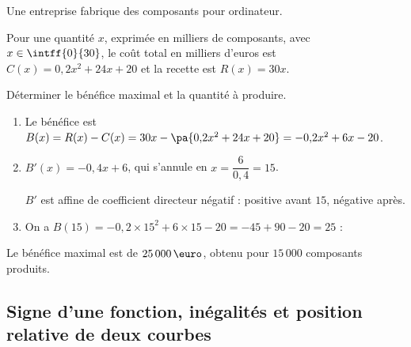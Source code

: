 \begin{methode}
	Une entreprise fabrique des composants pour ordinateur.

	Pour une quantité $x$, exprimée en milliers de composants, avec $x \in \intff{0}{30}$, le coût total en milliers d'euros est $C(x) = 0{,}2x^2 + 24x + 20$ et la recette est $R(x) = 30x$.

	Déterminer le bénéfice maximal et la quantité à produire.

	\begin{correction}
		\nline
		\begin{enumerate}
			\item Le bénéfice est $B(x) = R(x) - C(x) = 30x - \pa{0{,}2x^2 + 24x + 20} = -0{,}2x^2 + 6x - 20$.
			\item $B'(x) = -0{,}4x + 6$, qui s'annule en $x = \dfrac{6}{0{,}4} = 15$.

			      $B'$ est affine de coefficient directeur négatif : positive avant $15$, négative après.
			\item On a $B(15) = -0{,}2 \times 15^2 + 6 \times 15 - 20 = -45 + 90 - 20 = 25$ :

			      \ms

			      \begin{center}
			      \end{center}
		\end{enumerate}
		Le bénéfice maximal est de $25\,000\,\text{\euro}$, obtenu pour $15\,000$ composants produits.
	\end{correction}
\end{methode}

\newpage

\subsection{Signe d'une fonction, inégalités et position relative de deux courbes}

